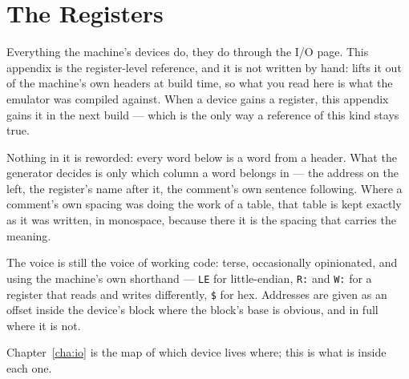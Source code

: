 \chapter{The Registers}\label{cha:registers}

Everything the machine's devices do, they do through the I/O page. This
appendix is the register-level reference, and it is not written by hand:
 lifts it out of the machine's own headers at
build time, so what you read here is what the emulator was compiled
against. When a device gains a register, this appendix gains it in the
next build --- which is the only way a reference of this kind stays true.

Nothing in it is reworded: every word below is a word from a header.
What the generator decides is only which column a word belongs in --- the
address on the left, the register's name after it, the comment's own
sentence following. Where a comment's own spacing was doing the work of a
table, that table is kept exactly as it was written, in monospace, because
there it is the spacing that carries the meaning.

The voice is still the voice of working code: terse, occasionally
opinionated, and using the machine's own shorthand --- \verb|LE| for
little-endian, \verb|R:| and \verb|W:| for a register that reads and
writes differently, \verb|$| for hex. Addresses are given as an offset
inside the device's block where the block's base is obvious, and in full
where it is not.

Chapter~\ref{cha:io} is the map of which device lives where; this is what
is inside each one.


